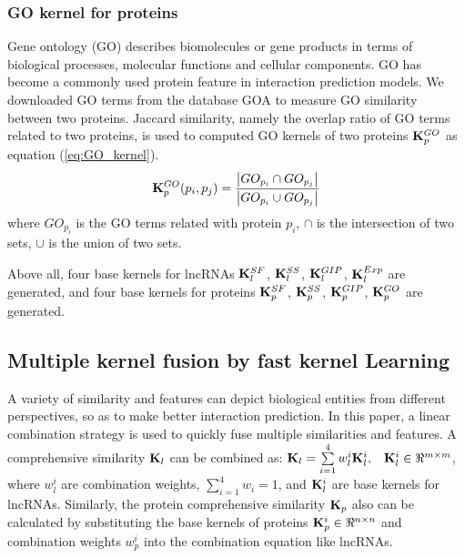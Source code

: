 \documentclass[fleqn,10pt]{wlscirep}
\begin{document}
\subsubsection*{GO kernel for proteins}
Gene ontology (GO) describes biomolecules or gene products in terms of biological processes, molecular functions and cellular components. GO has become a commonly used protein feature in interaction prediction models. We downloaded GO terms from the database GOA\cite{Wan2013} to measure GO similarity between two proteins. Jaccard similarity, namely the overlap ratio of GO terms related to two proteins, is used to computed GO kernels of two proteins ${\bf{K}}_p^{GO}$ as equation (\ref{eq:GO_kernel}).
\begin{equation}\label{eq:GO_kernel}
{\bf{K}}_p^{GO}({p_i},{p_j}) = \frac{{\left| {G{O_{{p_i}}} \cap G{O_{{p_j}}}} \right|}}{{\left| {G{O_{{p_i}}} \cup G{O_{{p_j}}}} \right|}}
\end{equation}
where ${G{O_{{p_i}}}}$ is the GO terms related with protein ${p_i}$, $ \cap $ is the intersection of two sets, $ \cup $ is the union of two sets.

Above all, four base kernels for lncRNAs ${\bf{K}}_l^{SF}$, ${\bf{K}}_l^{SS}$, ${\bf{K}}_l^{GIP}$, ${\bf{K}}_l^{Exp}$ are generated, and four base kernels for proteins ${\bf{K}}_p^{SF}$, ${\bf{K}}_p^{SS}$, ${\bf{K}}_p^{GIP}$, ${\bf{K}}_p^{GO}$ are generated.

\subsection*{Multiple kernel fusion by fast kernel Learning}
A variety of similarity and features can depict biological entities from different perspectives, so as to make better interaction prediction. In this paper, a linear combination strategy is used to quickly fuse multiple similarities and features\cite{He2008FastMatching,Shen2019}. A comprehensive  similarity ${{\bf{K}}_l}$ can be combined as: ${{\bf{K}}_l} = \sum\limits_{i = 1}^4 {w_l^i} {\bf{K}}_l^i,\;\;\;{\bf{K}}_l^i \in {\Re ^{m \times m}}$, where ${w_l^i}$ are combination weights, $\sum\limits_{i = 1}^4 {{w_i}}=1$, and ${\bf{K}}_l^i$ are base kernels for lncRNAs. Similarly, the protein comprehensive similarity ${{\bf{K}}_p}$ also can be calculated by substituting the base kernels of proteins ${\bf{K}}_p^i \in {\Re ^{n \times n}}$ and combination weights ${w_p^i}$ into the combination equation like lncRNAs. 
\end{document}
